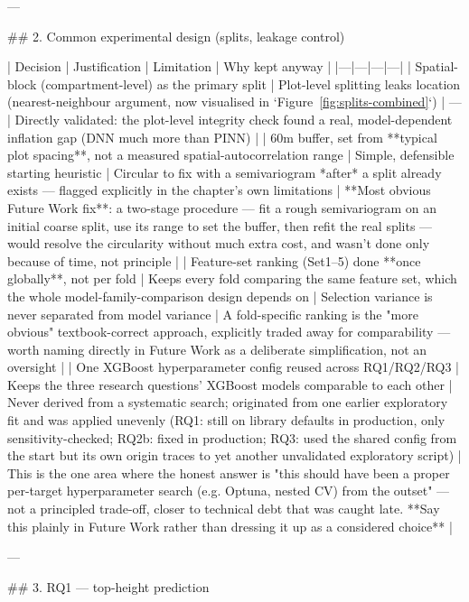 ---

## 2. Common experimental design (splits, leakage control)

| Decision | Justification | Limitation | Why kept anyway |
|---|---|---|---|
| Spatial-block (compartment-level) as the primary split | Plot-level splitting leaks location (nearest-neighbour argument, now visualised in `Figure~\ref{fig:splits-combined}`) | — | Directly validated: the plot-level integrity check found a real, model-dependent inflation gap (DNN much more than PINN) |
| 60m buffer, set from **typical plot spacing**, not a measured spatial-autocorrelation range | Simple, defensible starting heuristic | Circular to fix with a semivariogram *after* a split already exists — flagged explicitly in the chapter's own limitations | **Most obvious Future Work fix**: a two-stage procedure — fit a rough semivariogram on an initial coarse split, use its range to set the buffer, then refit the real splits — would resolve the circularity without much extra cost, and wasn't done only because of time, not principle |
| Feature-set ranking (Set1–5) done **once globally**, not per fold | Keeps every fold comparing the same feature set, which the whole model-family-comparison design depends on | Selection variance is never separated from model variance | A fold-specific ranking is the "more obvious" textbook-correct approach, explicitly traded away for comparability — worth naming directly in Future Work as a deliberate simplification, not an oversight |
| One XGBoost hyperparameter config reused across RQ1/RQ2/RQ3 | Keeps the three research questions' XGBoost models comparable to each other | Never derived from a systematic search; originated from one earlier exploratory fit and was applied unevenly (RQ1: still on library defaults in production, only sensitivity-checked; RQ2b: fixed in production; RQ3: used the shared config from the start but its own origin traces to yet another unvalidated exploratory script) | This is the one area where the honest answer is "this should have been a proper per-target hyperparameter search (e.g. Optuna, nested CV) from the outset" — not a principled trade-off, closer to technical debt that was caught late. **Say this plainly in Future Work rather than dressing it up as a considered choice** |

---

## 3. RQ1 — top-height prediction

